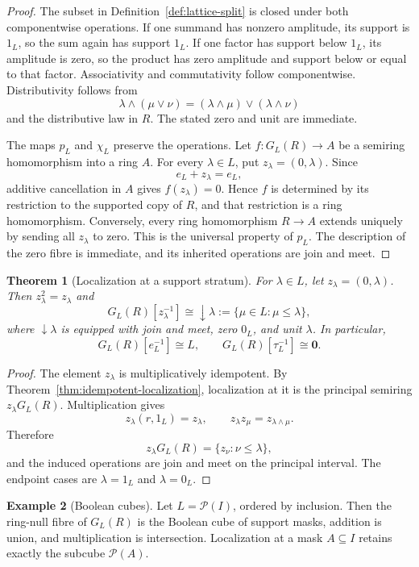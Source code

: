 \documentclass[11pt]{amsart}
\numberwithin{equation}{section}
\newtheorem{theorem}{Theorem}[section]
\theoremstyle{definition}
\newtheorem{example}[theorem]{Example}
\newcommand{\zero}{\mathbf 0}
\begin{document}
\begin{proof}
The subset in Definition~\ref{def:lattice-split} is closed under both
componentwise operations.  If one summand has nonzero amplitude, its
support is $1_L$, so the sum again has support $1_L$.  If one factor has
support below $1_L$, its amplitude is zero, so the product has zero
amplitude and support below or equal to that factor.  Associativity and
commutativity follow componentwise.  Distributivity follows from
\[
\lambda\wedge(\mu\vee\nu)
=(\lambda\wedge\mu)\vee(\lambda\wedge\nu)
\]
and the distributive law in $R$.  The stated zero and unit are immediate.

The maps $p_L$ and $\chi_L$ preserve the operations.  Let
$f:G_L(R)\to A$ be a semiring homomorphism into a ring $A$.  For every
$\lambda\in L$, put $z_\lambda=(0,\lambda)$.  Since
\[
e_L+z_\lambda=e_L,
\]
additive cancellation in $A$ gives $f(z_\lambda)=0$.  Hence $f$ is
determined by its restriction to the supported copy of $R$, and that
restriction is a ring homomorphism.  Conversely, every ring homomorphism
$R\to A$ extends uniquely by sending all $z_\lambda$ to zero.  This is the
universal property of $p_L$.  The description of the zero fibre is
immediate, and its inherited operations are join and meet.
\end{proof}

\begin{theorem}[Localization at a support stratum]
\label{thm:lattice-localization}
For $\lambda\in L$, let $z_\lambda=(0,\lambda)$.  Then
$z_\lambda^2=z_\lambda$ and
\[
G_L(R)[z_\lambda^{-1}]
\cong
\downarrow\lambda
:=\{\mu\in L:\mu\leq\lambda\},
\]
where $\downarrow\lambda$ is equipped with join and meet, zero $0_L$, and
unit $\lambda$.  In particular,
\[
G_L(R)[e_L^{-1}]\cong L,
\qquad
G_L(R)[\tau_L^{-1}]\cong\zero.
\]
\end{theorem}

\begin{proof}
The element $z_\lambda$ is multiplicatively idempotent.  By
Theorem~\ref{thm:idempotent-localization}, localization at it is the
principal semiring $z_\lambda G_L(R)$.  Multiplication gives
\[
z_\lambda(r,1_L)=z_\lambda,
\qquad
z_\lambda z_\mu=z_{\lambda\wedge\mu}.
\]
Therefore
\[
z_\lambda G_L(R)=\{z_\nu:\nu\leq\lambda\},
\]
and the induced operations are join and meet on the principal interval.
The endpoint cases are $\lambda=1_L$ and $\lambda=0_L$.
\end{proof}

\begin{example}[Boolean cubes]
Let $L=\mathcal P(I)$, ordered by inclusion.  Then the ring-null fibre of
$G_L(R)$ is the Boolean cube of support masks, addition is union, and
multiplication is intersection.  Localization at a mask $A\subseteq I$
retains exactly the subcube $\mathcal P(A)$.
\end{example}
\end{document}

